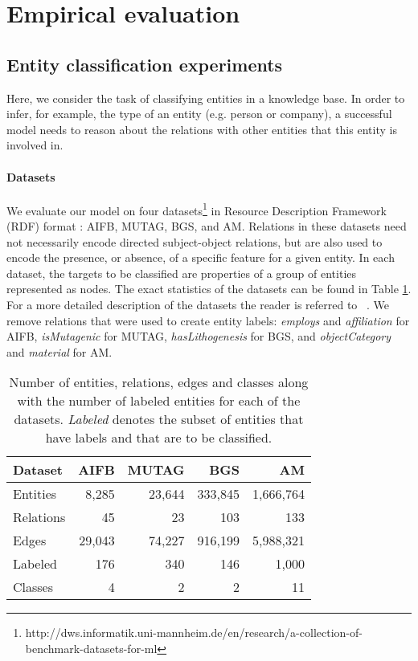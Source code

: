 \documentclass[letterpaper]{article} \usepackage{aaai18}  \usepackage{times}  \usepackage{helvet}  \usepackage{courier}  \usepackage{url}  \usepackage{graphicx}  \frenchspacing
\newcommand{\citet}[1]{\citeauthor{#1}~\shortcite{#1}}
\begin{document}
\section{Empirical evaluation}

\subsection{Entity classification experiments}\label{sec:ent_exp}
Here, we consider the task of classifying entities in a knowledge base. In order to infer, for example, the type of an entity (e.g. person or company), a successful model needs to reason about the relations with other entities that this entity is involved in.

\paragraph{Datasets}
We evaluate our model on four datasets\footnote{http://dws.informatik.uni-mannheim.de/en/research/a-collection-of-benchmark-datasets-for-ml} in Resource Description Framework (RDF) format \cite{ristoski2016collection}: AIFB, MUTAG, BGS, and AM. Relations in these datasets need not necessarily encode directed subject-object relations, but are also used to encode the presence, or absence, of a specific feature for a given entity. In each dataset, the targets to be classified are properties of a group of entities represented as nodes. The exact statistics of the datasets can be found in Table \ref{table:classification_datasets}. For a more detailed description of the datasets the reader is referred to \citet{ristoski2016collection}. We remove relations that were used to create entity labels: \textit{employs} and \textit{affiliation} for AIFB, \textit{isMutagenic} for MUTAG, \textit{hasLithogenesis} for BGS, and \textit{objectCategory} and \textit{material} for AM.

\begin{table}[htp!]
\centering
\begin{tabular}{lrrrr}
\toprule
Dataset & AIFB & MUTAG & BGS & AM  \\ \midrule
Entities    & 8,285 & 23,644 & 333,845 & 1,666,764 \\
Relations   & 45 & 23 & 103 & 133 \\
Edges   & 29,043 & 74,227 & 916,199& 5,988,321 \\
Labeled  & 176 & 340 & 146 &  1,000 \\
Classes  & 4 & 2 & 2 &  11 \\

 \bottomrule
\end{tabular}
\caption{Number of entities, relations, edges and classes along with the number of labeled entities for each of the datasets. \textit{Labeled} denotes the subset of entities that have labels and that are to be classified.}
\label{table:classification_datasets}
\end{table}
\end{document}
